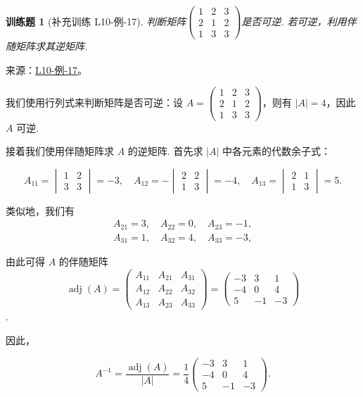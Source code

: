 \documentclass[UTF8,12pt,a4paper,fontset=fandol]{ctexart}
\newtheorem{exercise}{训练题}[section]
\begin{document}
\begin{exercise}[补充训练 L10-例-17]\label{prob:L10-例-17}
判断矩阵$\begin{pmatrix}
            1 & 2 & 3 \\ 2 & 1 & 2 \\ 1 & 3 & 3
        \end{pmatrix}$是否可逆. 若可逆，利用伴随矩阵求其逆矩阵.
\end{exercise}
\noindent 来源：\href{https://github.com/yhwu-is/Linear-Algebra-Left-Undone/blob/new/%E8%AE%B2%E4%B9%89/%E4%B8%93%E9%A2%98/10%20%E8%A1%8C%E5%88%97%E5%BC%8F.tex}{L10-例-17}。
\begin{solve}
我们使用行列式来判断矩阵是否可逆：设 $A=\begin{pmatrix}
        1 & 2 & 3 \\ 2 & 1 & 2 \\ 1 & 3 & 3
    \end{pmatrix}$，则有 $|A| = 4$，因此 $A$ 可逆.

    接着我们使用伴随矩阵求 $A$ 的逆矩阵. 首先求 $|A|$ 中各元素的代数余子式：

    \[
        A_{11} = \begin{vmatrix}
            1 & 2 \\ 3 & 3
        \end{vmatrix} = -3, \quad
        A_{12} = - \begin{vmatrix}
            2 & 2 \\ 1 & 3
        \end{vmatrix} = -4, \quad
        A_{13} = \begin{vmatrix}
            2 & 1 \\ 1 & 3
        \end{vmatrix} = 5.
    \]

    类似地，我们有
    \begin{gather*}
        A_{21} = 3, \quad A_{22} = 0, \quad A_{23} = -1, \\
        A_{31} = 1, \quad A_{32} = 4, \quad A_{33} = -3,
    \end{gather*}

    由此可得 $A$ 的伴随矩阵 
\[\operatorname{adj}(A) = \begin{pmatrix}
            A_{11} & A_{21} & A_{31} \\
            A_{12} & A_{22} & A_{32} \\
            A_{13} & A_{23} & A_{33}
        \end{pmatrix} = \begin{pmatrix}
            -3 & 3 & 1 \\
            -4 & 0 & 4 \\
            5 & -1 & -3
        \end{pmatrix}\]
.

    因此，

    \[
        A^{-1} = \dfrac{\operatorname{adj}(A)}{|A|} = \dfrac{1}{4} \begin{pmatrix}
            -3 & 3 & 1 \\
            -4 & 0 & 4 \\
            5 & -1 & -3
            \end{pmatrix}.
    \]
\end{solve}
\end{document}
